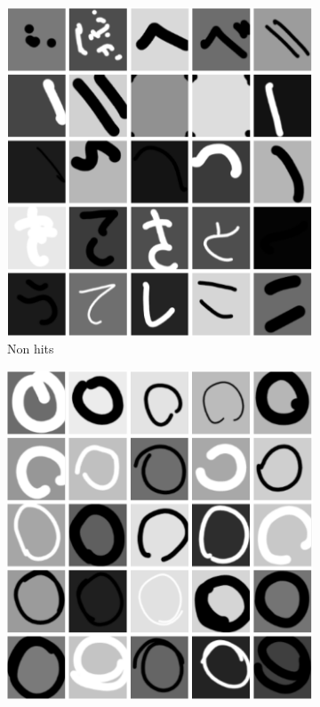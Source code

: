 \begin{figure}
    \centering
    \begin{subfigure}[b]{0.3\textwidth}
        \includegraphics[width=\textwidth]{images/25_n.png}
        \caption{Non hits}
        \label{fig:25_non_hits}
    \end{subfigure}
    \begin{subfigure}[b]{0.3\textwidth}
        \includegraphics[width=\textwidth]{images/25_o.png}

\end{subfigure}
\end{figure}
